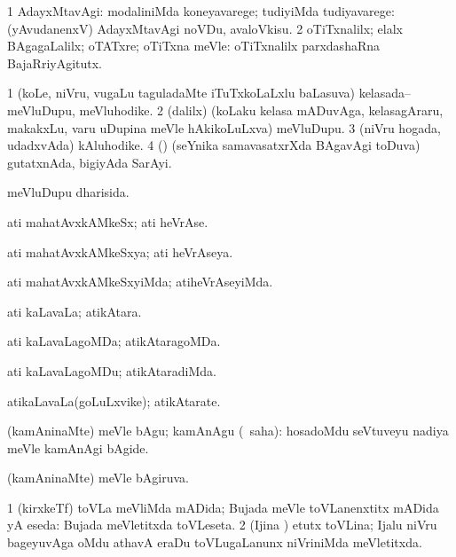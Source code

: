 \bentry
{}
\gl{\kirxvi}
\bmng
\bnum
\num{1} AdayxMtavAgi: modaliniMda koneyavarege; tudiyiMda tudiyavarege:  (yAvudanenxV) AdayxMtavAgi noVDu, avaloVkisu. 
\num{2} oTiTxnalilx; elalx BAgagaLalilx; oTATxre; oTiTxna meVle:  oTiTxnalilx parxdashaRna BajaRriyAgitutx. 
\enum
\emng
\eentry

\bentry
{}
\gl{\nA}
\bmng
\bnum
\num{1} (koLe, niVru, \mo vugaLu taguladaMte iTuTxkoLaLxlu baLasuva) kelasada--meVluDupu, meVluhodike. 
\num{2} (\bava dalilx) (koLaku kelasa mADuvAga, kelasagAraru, makakxLu, \mo varu uDupina meVle hAkikoLuLxva) meVluDupu. 
\num{3} (niVru hogada, udadxvAda) kAluhodike. 
\num{4} (\birx) (seYnika samavasatxrXda BAgavAgi toDuva) gutatxnAda, bigiyAda SarAyi. 
\enum
\emng
\eentry

\bentry
{}
\gl{\gu}
\bmng
meVluDupu dharisida. 
\emng
\eentry

\bentry
{}
\gl{\nA}
\bmng
ati mahatAvxkAMkeSx; ati heVrAse. 
\emng
\eentry

\bentry
{}
\gl{\gu}
\bmng
ati mahatAvxkAMkeSxya; ati heVrAseya. 
\emng
\eentry

\bentry
{}
\gl{\kirxvi}
\bmng
ati mahatAvxkAMkeSxyiMda; atiheVrAseyiMda. 
\emng
\eentry

\bentry
{}
\gl{\nA}
\bmng
ati kaLavaLa; atikAtara. 
\emng
\eentry

\bentry
{}
\gl{\gu}
\bmng
ati kaLavaLagoMDa; atikAtaragoMDa. 
\emng
\eentry

\bentry
{}
\gl{\kirxvi}
\bmng
ati kaLavaLagoMDu; atikAtaradiMda. 
\emng
\eentry

\bentry
{}
\gl{\nA}
\bmng
atikaLavaLa(goLuLxvike); atikAtarate. 
\emng
\eentry

\bentry
{}
\gl{\sakirx}
\bmng
(kamAninaMte) meVle bAgu; kamAnAgu (\akirx\ saha):  hosadoMdu seVtuveyu nadiya meVle kamAnAgi bAgide. 
\emng
\eentry

\bentry
{}
\gl{\gu}
\bmng
(kamAninaMte) meVle bAgiruva. 
\emng
\eentry

\bentry
{}
\gl{\gu}
\bmng
\bnum
\num{1} (kirxkeTf) toVLa meVliMda mADida; Bujada meVle toVLanenxtitx mADida yA eseda:  Bujada meVletitxda toVLeseta. 
\num{2} (Ijina \vi) etutx toVLina; Ijalu niVru bageyuvAga oMdu athavA eraDu toVLugaLanunx niVriniMda meVletitxda. 
\enum
\emng
\eentry

